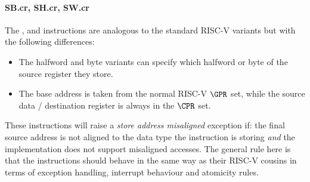 
\paragraph{SB.cr, SH.cr, SW.cr}

The ,  and  instructions are analogous to
the standard RISC-V variants but with the following differences:

\begin{itemize}
\item The halfword and byte variants can specify which halfword or byte of
      the source register they store.
\item The base address is taken from the normal RISC-V $\GPR$ set, while the
      source data / destination register is always in the $\CPR$ set.
\end{itemize}

These instructions will raise a {\em store address misaligned} exception
if: the final source address is not aligned to the data type the instruction
is storing {\em and} the implementation does not support misaligned accesses.
The general rule here is that the  instructions should behave in
the same way as their RISC-V cousins in terms of exception handling,
interrupt behaviour and atomicity rules.

